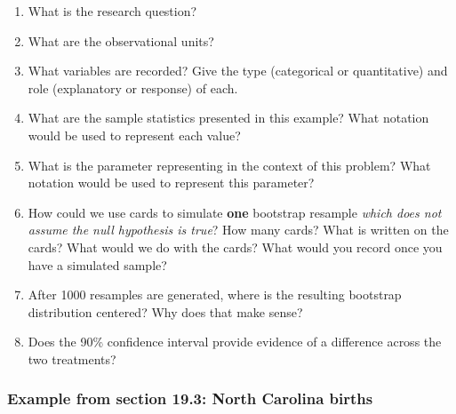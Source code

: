 \documentclass[
]{report}
\newcommand{\rgs}{\vspace{12pt}} %
\begin{document}
\begin{enumerate}
\def\labelenumi{\arabic{enumi}.}
\item
  What is the research question?
  \rgs
\item
  What are the observational units?
  \rgs
\item
  What variables are recorded? Give the type (categorical or quantitative) and role (explanatory or response) of each.
  \rgs
  \rgs
\item
  What are the sample statistics presented in this example? What notation would be used to represent each value?
  \rgs
\item
  What is the parameter representing in the context of this problem? What notation would be used to represent this parameter?
  \rgs
  \rgs
\item
  How could we use cards to simulate \textbf{one} bootstrap resample \emph{which does not assume the null hypothesis is true}? How many cards? What is written on the cards? What would we do with the cards? What would you record once you have a simulated sample?
  \rgs
  \rgs
  \rgs
\item
  After 1000 resamples are generated, where is the resulting bootstrap distribution centered? Why does that make sense?
  \rgs
  \rgs
\item
  Does the 90\% confidence interval provide evidence of a difference across the two treatments?
  \rgs
  \rgs
\end{enumerate}

\hypertarget{example-from-section-19.3-north-carolina-births}{%
\subsubsection*{Example from section 19.3: North Carolina births}\label{example-from-section-19.3-north-carolina-births}}
\end{document}
